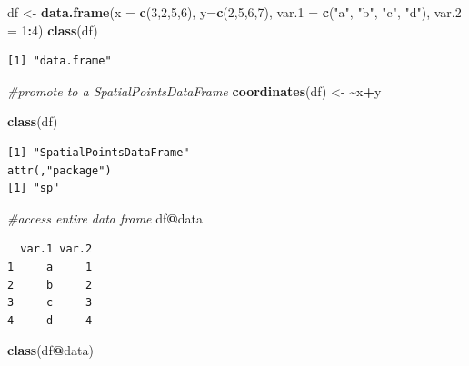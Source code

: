 \documentclass[
]{krantz}
\makeatletter
\newenvironment{Shaded}{\begin{snugshade}}{\end{snugshade}}
\newcommand{\CommentTok}[1]{\textcolor[rgb]{0.37,0.37,0.37}{\textit{#1}}}
\newcommand{\DataTypeTok}[1]{\textcolor[rgb]{0.27,0.27,0.27}{#1}}
\newcommand{\DecValTok}[1]{\textcolor[rgb]{0.06,0.06,0.06}{#1}}
\newcommand{\ErrorTok}[1]{\textcolor[rgb]{0.14,0.14,0.14}{\textbf{#1}}}
\newcommand{\KeywordTok}[1]{\textcolor[rgb]{0.27,0.27,0.27}{\textbf{#1}}}
\newcommand{\NormalTok}[1]{#1}
\newcommand{\OperatorTok}[1]{\textcolor[rgb]{0.43,0.43,0.43}{\textbf{#1}}}
\newcommand{\StringTok}[1]{\textcolor[rgb]{0.5,0.5,0.5}{#1}}
\newenvironment{kframe}{%
\medskip{}
\setlength{\fboxsep}{.8em}
 \def\at@end@of@kframe{}%
 \ifinner\ifhmode%
  \def\at@end@of@kframe{\end{minipage}}%
  \begin{minipage}{\columnwidth}%
 \fi\fi%
 \def\FrameCommand##1{\hskip\@totalleftmargin \hskip-\fboxsep
 \colorbox{shadecolor}{##1}\hskip-\fboxsep
     \hskip-\linewidth \hskip-\@totalleftmargin \hskip\columnwidth}%
 \MakeFramed {\advance\hsize-\width
   \@totalleftmargin\z@ \linewidth\hsize
   \@setminipage}}%
 {\par\unskip\endMakeFramed%
 \at@end@of@kframe}
\renewenvironment{Shaded}{\begin{kframe}}{\end{kframe}}
\makeatother
\begin{document}
\begin{Shaded}
\begin{Highlighting}[]
\NormalTok{df \textless{}{-}}\StringTok{ }\KeywordTok{data.frame}\NormalTok{(}\DataTypeTok{x =} \KeywordTok{c}\NormalTok{(}\DecValTok{3}\NormalTok{,}\DecValTok{2}\NormalTok{,}\DecValTok{5}\NormalTok{,}\DecValTok{6}\NormalTok{), }\DataTypeTok{y=}\KeywordTok{c}\NormalTok{(}\DecValTok{2}\NormalTok{,}\DecValTok{5}\NormalTok{,}\DecValTok{6}\NormalTok{,}\DecValTok{7}\NormalTok{), }\DataTypeTok{var.1 =} \KeywordTok{c}\NormalTok{(}\StringTok{"a"}\NormalTok{, }\StringTok{"b"}\NormalTok{, }\StringTok{"c"}\NormalTok{, }\StringTok{"d"}\NormalTok{), }\DataTypeTok{var.2 =} \DecValTok{1}\OperatorTok{:}\DecValTok{4}\NormalTok{)}
\KeywordTok{class}\NormalTok{(df)}
\end{Highlighting}
\end{Shaded}

\begin{verbatim}
[1] "data.frame"
\end{verbatim}

\begin{Shaded}
\begin{Highlighting}[]
\CommentTok{\#promote to a SpatialPointsDataFrame}
\KeywordTok{coordinates}\NormalTok{(df) \textless{}{-}}\StringTok{ }\ErrorTok{\textasciitilde{}}\NormalTok{x}\OperatorTok{+}\NormalTok{y}

\KeywordTok{class}\NormalTok{(df)}
\end{Highlighting}
\end{Shaded}

\begin{verbatim}
[1] "SpatialPointsDataFrame"
attr(,"package")
[1] "sp"
\end{verbatim}

\begin{Shaded}
\begin{Highlighting}[]
\CommentTok{\#access entire data frame}
\NormalTok{df}\OperatorTok{@}\NormalTok{data}
\end{Highlighting}
\end{Shaded}

\begin{verbatim}
  var.1 var.2
1     a     1
2     b     2
3     c     3
4     d     4
\end{verbatim}

\begin{Shaded}
\begin{Highlighting}[]
\KeywordTok{class}\NormalTok{(df}\OperatorTok{@}\NormalTok{data)}
\end{Highlighting}
\end{Shaded}
\end{document}
